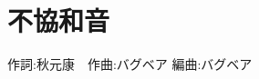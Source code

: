 \section{不協和音}

\begin{center}
    \scriptsize{
        作詞:秋元康　作曲:バグベア	編曲:バグベア
    }
\end{center}

\vspace{0.7em}

\begin{Parallel}[c]{0.47\textwidth}{0.47\textwidth}

\ParallelLText{
    \footnotesize{
        
    }
}

\ParallelRText{
    \footnotesize{
        
    }
}

\end{Parallel}
